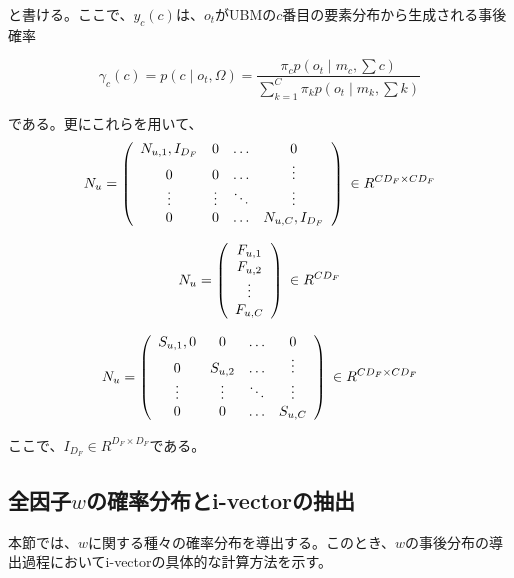 と書ける。ここで、$y_c(c)$は、$o_t$がUBMの$c$番目の要素分布から生成される事後確率

\begin{equation}
\gamma_c(c)=p(c\mid o_t,Ω)=\frac{\pi_cp(o_t\mid m_c,\sum c)}{\sum_{k=1}^C \pi_kp(o_t\mid m_k,\sum k)}
\end{equation}

である。更にこれらを用いて、
\begin{equation}
  N_u = \left(
    \begin{array}{cccc}
      N_{u,1},I_{D_F} & 0 & \ldots & 0 \\
      0 & 0 & \ldots & \vdots \\
      \vdots & \vdots & \ddots & \vdots \\
      0 & 0 & \ldots & N_{u,C},I_{D_F}
    \end{array}
  \right)
\text{  $\in R^{CD_F\times CD_F}$}\\
\end{equation}

\begin{equation}
  N_u = \left(
    \begin{array}{cccc}
      F_{u,1} \\
      F_{u,2} \\
      \vdots\\
      F_{u,C}
    \end{array}
  \right)
\text{  $\in R^{CD_F}$}\\
\end{equation}

\begin{equation}
  N_u = \left(
    \begin{array}{cccc}
      S_{u,1},0 & 0 & \ldots & 0 \\
      0 & S_{u,2} & \ldots & \vdots \\
      \vdots & \vdots & \ddots & \vdots \\
      0 & 0 & \ldots & S_{u,C}
    \end{array}
  \right)
\text{  $\in R^{CD_F\times CD_F}$}\\
\end{equation}

ここで、$I_{D_F}\in R^{D_F\times D_F}$である。

\subsection{全因子$w$の確率分布とi-vectorの抽出}
本節では、$w$に関する種々の確率分布を導出する。このとき、$w$の事後分布の導出過程においてi-vectorの具体的な計算方法を示す。

